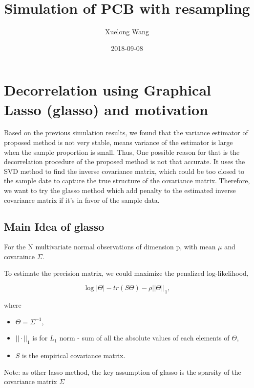 \documentclass[]{article}
\title{Simulation of PCB with resampling}
\author{Xuelong Wang}
\date{2018-09-08}
\providecommand{\tightlist}{%
  \setlength{\itemsep}{0pt}\setlength{\parskip}{0pt}}
\begin{document}
\maketitle

{
\setcounter{tocdepth}{2}
\tableofcontents
}
\section{Decorrelation using Graphical Lasso (glasso) and
motivation}\label{decorrelation-using-graphical-lasso-glasso-and-motivation}

Based on the previous simulation results, we found that the variance
estimator of proposed method is not very stable, means variance of the
estimator is large when the sample proportion is small. Thus, One
possible reason for that is the decorrelation procedure of the proposed
method is not that accurate. It uses the SVD method to find the inverse
covariance matrix, which could be too closed to the sample date to
capture the true structure of the covariance matrix. Therefore, we want
to try the glasso method which add penalty to the estimated inverse
covariance matrix if it's in favor of the sample data.

\subsection{Main Idea of glasso}\label{main-idea-of-glasso}

For the N multivariate normal observations of dimension p, with mean
\(\mu\) and covaraince \(\Sigma\).

To estimate the precision matrix, we could maximize the penalized
log-likelihood,

\[
  \log{|\Theta|} - tr(S\Theta) - \rho||\Theta||_1,
\]

where

\begin{itemize}
\tightlist
\item
  \(\Theta = \Sigma^{-1}\),\\
\item
  \(||\cdot||_1\) is for \(L_1\) norm - sum of all the absolute values
  of each elements of \(\Theta\),\\
\item
  \(S\) is the empirical covariance matrix.
\end{itemize}

Note: as other lasso method, the key assumption of glasso is the
sparsity of the covariance matrix \(\Sigma\)
\end{document}
